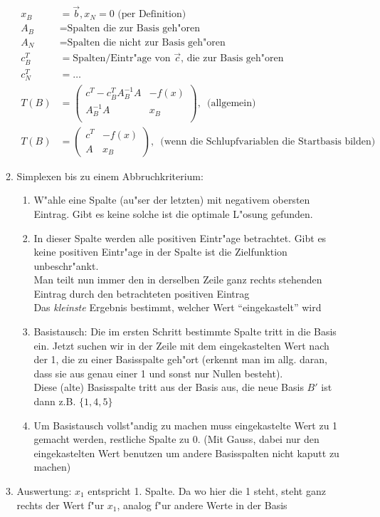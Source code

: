 \documentclass[fleqn,12pt]{scrartcl}
\begin{document}
\begin{itemize}
\begin{enumerate}
\begin{align*}
					x_B &= \vec b, x_N = 0 \text{ (per Definition)}\\
					A_B &= \text{Spalten die zur Basis geh"oren}\\
					A_N &= \text{Spalten die nicht zur Basis geh"oren}\\
					c_B^T &= \text{Spalten/Eintr"age von } \vec c \text{, die zur Basis geh"oren}\\
					c_N^T &= \dots\\
					T(B) &= \begin{pmatrix}
						c^T - c^T_BA_B^{-1}A & -f(x)\\
						A_B^{-1}A & x_B\\
					\end{pmatrix}, \, \text{ (allgemein)}\\
						T(B) &= \begin{pmatrix}
							c^T & -f(x)\\
							A & x_B
						\end{pmatrix}, \, \text{ (wenn die Schlupfvariablen die Startbasis bilden)}
				\end{align*}
			\item
				Simplexen bis zu einem Abbruchkriterium:
				\begin{enumerate}
					\item
						W"ahle eine Spalte (au"ser der letzten) mit negativem obersten Eintrag. Gibt es keine solche ist die optimale L"osung gefunden.
					\item
						In dieser Spalte werden alle positiven Eintr"age betrachtet. Gibt es keine positiven Eintr"age in der Spalte ist die Zielfunktion unbeschr"ankt.\\
						Man teilt nun immer den in derselben Zeile ganz rechts stehenden Eintrag durch den betrachteten positiven Eintrag\\
						Das \emph{kleinste} Ergebnis bestimmt, welcher Wert \enquote{eingekastelt} wird
					\item
						Basistausch: Die im ersten Schritt bestimmte Spalte tritt in die Basis ein.
						Jetzt suchen wir in der Zeile mit dem eingekastelten Wert nach der 1, die zu einer Basisspalte geh"ort (erkennt man im allg. daran, dass sie aus genau einer 1 und sonst nur Nullen besteht).\\
						Diese (alte) Basisspalte tritt aus der Basis aus, die neue Basis $B'$ ist dann z.B. $\{1,4,5\}$
					\item
						Um Basistausch vollst"andig zu machen muss eingekastelte Wert zu 1 gemacht werden, restliche Spalte zu 0. (Mit Gauss, dabei nur den eingekastelten Wert benutzen um andere Basisspalten nicht kaputt zu machen)
				\end{enumerate}
			\item
				Auswertung: $x_1$ entspricht 1. Spalte. Da wo hier die 1 steht, steht ganz rechts der Wert f"ur $x_1$, analog f"ur andere Werte in der Basis
		\end{enumerate}
\end{itemize}
\end{document}
